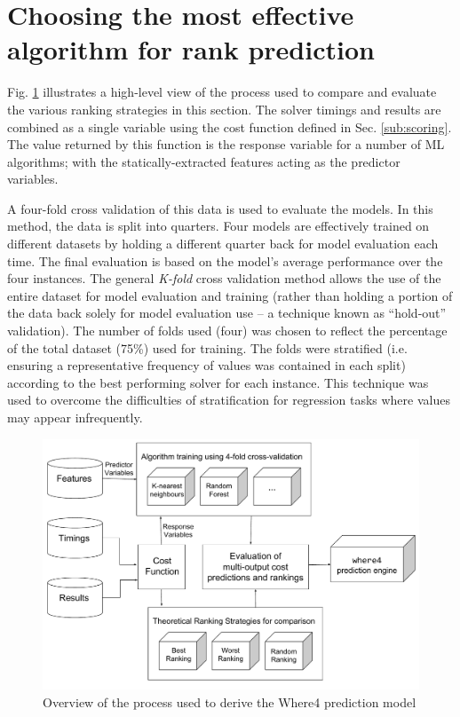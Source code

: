 \section{Choosing the most effective algorithm for rank prediction}
\label{pred:choosing}


Fig. \ref{fig:Chapter4} illustrates a high-level view of the process used to compare and evaluate the various ranking strategies in this section. 
The solver timings and results are combined as a single variable using the cost function defined in Sec. \ref{sub:scoring}.
The value returned by this function is the response variable for a number of ML algorithms; with the statically-extracted features acting as the predictor variables.

A four-fold cross validation of this data is used to evaluate the models. 
In this method, the data is split into quarters.
Four models are effectively trained on different datasets by holding a different quarter back for model evaluation each time.
The final evaluation is based on the model's average performance over the four instances.
The general \textit{K-fold} cross validation method allows the use of the entire dataset for model evaluation and training (rather than holding a portion of the data back solely for model evaluation use -- a technique known as ``hold-out'' validation). 
The number of folds used (four) was chosen to reflect the percentage of the total dataset (75\%) used for training. 
The folds were stratified (i.e. ensuring a representative frequency of values was contained in each split) according to the best performing solver for each instance.
This technique was used to overcome the difficulties of stratification for regression tasks where values may appear infrequently.  

\begin{figure}
	\centering
	\includegraphics[width=1.0\linewidth]{Figures/Chapter4}
	\caption{Overview of the process used to derive the \textsf{Where4} prediction model}
	\label{fig:Chapter4}
\end{figure}

